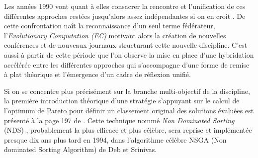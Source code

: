 Les années 1990 vont quant à elles consacrer la rencontre et l'unification de ces différentes approches restées jusqu'alors assez indépendantes si on en croit \textcite{DeJong2006a}. De cette confrontation naît la reconnaissance d'un seul terme fédérateur, l'\textit{Evolutionary Computation (EC)} motivant alors la création de nouvelles conférences et de nouveaux journaux structurant cette nouvelle discipline. C'est aussi à partir de cette période que l'on observe la mise en place d'une hybridation accélérée entre les différentes approches qui s'accompagne d'une forme de remise à plat théorique et l'émergence d'un cadre de réflexion unifié. \autocites[23-31]{DeJong2006a}{Back1997}

Si on se concentre plus précisément sur la branche multi-objectif de la discipline, la première introduction théorique d'une stratégie s'appuyant sur le calcul de l'optimum de Pareto pour définir un classement original des solutions évaluées est présenté à la page 197 de \textcite[197]{Goldberg1989}. Cette technique nommé \textit{Non Dominated Sorting} (NDS) \autocite[40-43]{Deb2001}, probablement la plus efficace et plus célèbre, sera reprise et implémentée presque dix ans plus tard en 1994, dans l'algorithme célèbre NSGA (Non dominated Sorting Algorithm) de Deb et Srinivas.

